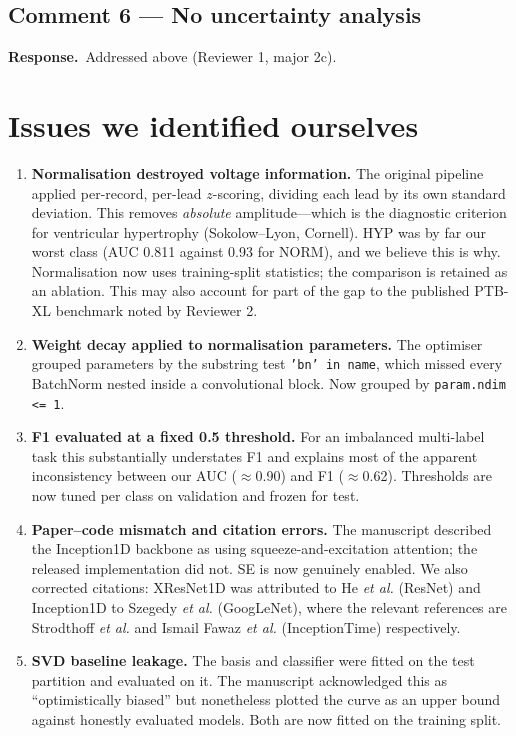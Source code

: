 \documentclass[11pt,a4paper]{article}
\newcommand{\response}{\par\noindent\textbf{Response.}\ }
\newcommand{\etal}{\textit{et al.}}
\begin{document}
\subsection*{Comment 6 --- No uncertainty analysis}

\response Addressed above (Reviewer 1, major 2c).

\section{Issues we identified ourselves}
\label{sec:selffound}

\begin{enumerate}[leftmargin=*,itemsep=4pt]
\item \textbf{Normalisation destroyed voltage information.} The original
pipeline applied per-record, per-lead $z$-scoring, dividing each lead by its
own standard deviation. This removes \emph{absolute} amplitude---which is the
diagnostic criterion for ventricular hypertrophy (Sokolow--Lyon, Cornell).
HYP was by far our worst class (AUC 0.811 against 0.93 for NORM), and we
believe this is why. Normalisation now uses training-split statistics; the
comparison is retained as an ablation. This may also account for part of the
gap to the published PTB-XL benchmark noted by Reviewer 2.

\item \textbf{Weight decay applied to normalisation parameters.} The
optimiser grouped parameters by the substring test \texttt{'bn' in name},
which missed every BatchNorm nested inside a convolutional block. Now grouped
by \texttt{param.ndim <= 1}.

\item \textbf{F1 evaluated at a fixed 0.5 threshold.} For an imbalanced
multi-label task this substantially understates F1 and explains most of the
apparent inconsistency between our AUC ($\approx$0.90) and F1 ($\approx$0.62).
Thresholds are now tuned per class on validation and frozen for test.

\item \textbf{Paper--code mismatch and citation errors.} The manuscript
described the Inception1D backbone as using squeeze-and-excitation attention;
the released implementation did not. SE is now genuinely enabled. We also
corrected citations: XResNet1D was attributed to He \etal{} (ResNet) and
Inception1D to Szegedy \etal{} (GoogLeNet), where the relevant references are
Strodthoff \etal{} and Ismail Fawaz \etal{} (InceptionTime) respectively.

\item \textbf{SVD baseline leakage.} The basis and classifier were fitted on
the test partition and evaluated on it. The manuscript acknowledged this as
``optimistically biased'' but nonetheless plotted the curve as an upper bound
against honestly evaluated models. Both are now fitted on the training split.


\end{enumerate}
\end{document}
